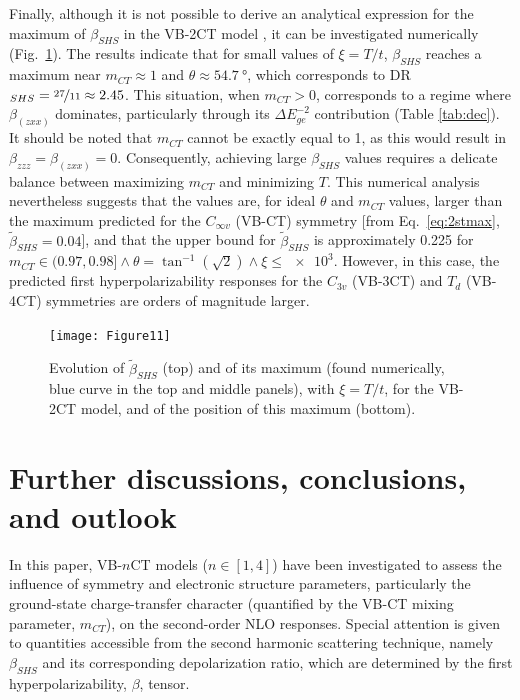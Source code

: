 \documentclass[USenglish]{article}
\begin{document}
Finally, although it is not possible to derive an analytical expression for the maximum of $\beta_{SHS}$ in the VB-2CT model \cite{yangLargeOffDiagonalContribution2003}, it can be investigated numerically (Fig.~\ref{fig:3stmax}). The results indicate that for small values of $\xi = T/t$, $\beta_{SHS}$ reaches a maximum near $m_{CT} \approx 1$ and $\theta \approx \SI{54.7}{\degree}$, which corresponds to DR$_{SHS}=\nicefrac{27}{11}\approx 2.45$. This situation, when $m_{CT} > 0$, corresponds to a regime where $\beta_{(zxx)}$ dominates, particularly through its $\Delta E_{ge}^{-2}$ contribution (Table \ref{tab:dec}). It should be noted that $m_{CT}$ cannot be exactly equal to 1, as this would result in $\beta_{zzz} = \beta_{(zxx)} = 0$. Consequently, achieving large $\beta_{SHS}$ values requires a delicate balance between maximizing $m_{CT}$ and minimizing $T$. This numerical analysis nevertheless suggests that the values are, for ideal $\theta$ and $m_{CT}$ values, larger than the maximum predicted for the $C_{\infty v}$ (VB-CT) symmetry [from Eq.~\eqref{eq:2stmax}, $\tilde\beta_{SHS}=0.04$], and that the upper bound for $\tilde\beta_{SHS}$ is approximately 0.225 for $m_{CT}\in(0.97,0.98]\land \theta = \tan^{-1}(\sqrt{2}) \land \xi \leq \num{e3}$. However, in this case, the predicted first hyperpolarizability responses for the $C_{3v}$ (VB-3CT) and $T_d$  (VB-4CT) symmetries are orders of magnitude larger.

\begin{figure}[!h]
	\texttt{[image: Figure11]}
	\caption{Evolution of $\tilde\beta_{SHS}$ (top) and of its maximum (found numerically, blue curve in the top and middle panels), with $\xi = T/t$, for the VB-2CT model, and of the position of this maximum (bottom).}
	\label{fig:3stmax}
\end{figure}

\clearpage

\section{Further discussions, conclusions, and outlook}

In this paper, VB-$n$CT models ($n \in [1,4]$) have been investigated to assess the influence of symmetry and electronic structure parameters, particularly the ground-state charge-transfer character (quantified by the VB-CT mixing parameter, $m_{CT}$), on the second-order NLO responses. Special attention is given to quantities accessible from the second harmonic scattering technique, namely $\beta_{SHS}$ and its corresponding depolarization ratio, which are determined by the first hyperpolarizability, $\beta$, tensor.   
\end{document}
